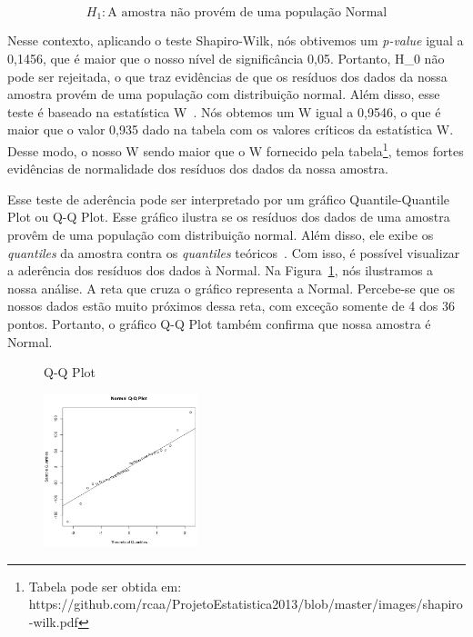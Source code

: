 \begin{equation}
	H_{1} : \text{A amostra não provém de uma população Normal}
\end{equation}

Nesse contexto, aplicando o teste Shapiro-Wilk, nós obtivemos um \emph{p-value} igual a 0,1456, que é maior que o nosso nível de significância 0,05. Portanto, H_{0} não pode ser rejeitada, o que traz evidências de que os resíduos dos dados da nossa amostra provém de uma população com distribuição normal. Além disso, esse teste é baseado na estatística W~\cite{estatisticaw}. Nós obtemos um W igual a 0,9546, o que é maior que o valor 0,935 dado na tabela com os valores críticos da estatística W. Desse modo, o nosso W sendo maior que o W fornecido pela tabela\footnote{Tabela pode ser obtida em: https://github.com/rcaa/ProjetoEstatistica2013/blob/master/images/shapiro-wilk.pdf}, temos fortes evidências de normalidade dos resíduos dos dados da nossa amostra.

Esse teste de aderência pode ser interpretado por um gráfico Quantile-Quantile Plot ou Q-Q Plot. Esse gráfico ilustra se os resíduos dos dados de uma amostra provêm de uma população com distribuição normal. Além disso, ele exibe os \emph{quantiles} da amostra contra os \emph{quantiles} teóricos~\cite{Wilk1968}. Com isso, é possível visualizar a aderência dos resíduos dos dados à Normal. Na Figura~\ref{fig:grafico1}, nós ilustramos a nossa análise. A reta que cruza o gráfico representa a Normal. Percebe-se que os nossos dados estão muito próximos dessa reta, com exceção somente de 4 dos 36 pontos. Portanto, o gráfico Q-Q Plot também confirma que nossa amostra é Normal.


\begin{figure}[t]
	\caption{Q-Q Plot}
    \centering
    \includegraphics[width=0.4\textwidth]{images/qqplot.png}
    \caption{}
    \label{fig:grafico1}
\end{figure}